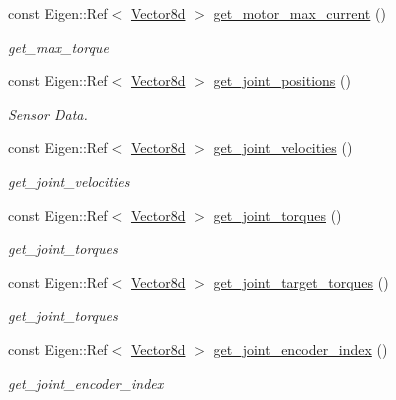 \begin{DoxyCompactItemize}
const Eigen\+::\+Ref$<$ \hyperlink{common__header_8hpp_a98975ffbe0bca1296078e0350dfedd60}{Vector8d} $>$ \hyperlink{classblmc__robots_1_1Solo8TI_a6258a43a859e3cb589e7ed4ad7ca23cc}{get\+\_\+motor\+\_\+max\+\_\+current} ()
\begin{DoxyCompactList}\small\item\em get\+\_\+max\+\_\+torque \end{DoxyCompactList}\item 
const Eigen\+::\+Ref$<$ \hyperlink{common__header_8hpp_a98975ffbe0bca1296078e0350dfedd60}{Vector8d} $>$ \hyperlink{classblmc__robots_1_1Solo8TI_ac9165114408f88accbaa151b797ed1b6}{get\+\_\+joint\+\_\+positions} ()
\begin{DoxyCompactList}\small\item\em Sensor Data. \end{DoxyCompactList}\item 
const Eigen\+::\+Ref$<$ \hyperlink{common__header_8hpp_a98975ffbe0bca1296078e0350dfedd60}{Vector8d} $>$ \hyperlink{classblmc__robots_1_1Solo8TI_ae419d6776511856df3ff54e348774a97}{get\+\_\+joint\+\_\+velocities} ()
\begin{DoxyCompactList}\small\item\em get\+\_\+joint\+\_\+velocities \end{DoxyCompactList}\item 
const Eigen\+::\+Ref$<$ \hyperlink{common__header_8hpp_a98975ffbe0bca1296078e0350dfedd60}{Vector8d} $>$ \hyperlink{classblmc__robots_1_1Solo8TI_a79339925d2ad19cf8efff3af728a766f}{get\+\_\+joint\+\_\+torques} ()
\begin{DoxyCompactList}\small\item\em get\+\_\+joint\+\_\+torques \end{DoxyCompactList}\item 
const Eigen\+::\+Ref$<$ \hyperlink{common__header_8hpp_a98975ffbe0bca1296078e0350dfedd60}{Vector8d} $>$ \hyperlink{classblmc__robots_1_1Solo8TI_a3ed929d26586ef0aa35c4952e8c61f6d}{get\+\_\+joint\+\_\+target\+\_\+torques} ()
\begin{DoxyCompactList}\small\item\em get\+\_\+joint\+\_\+torques \end{DoxyCompactList}\item 
const Eigen\+::\+Ref$<$ \hyperlink{common__header_8hpp_a98975ffbe0bca1296078e0350dfedd60}{Vector8d} $>$ \hyperlink{classblmc__robots_1_1Solo8TI_a64832124d666033300a2d163db799f8a}{get\+\_\+joint\+\_\+encoder\+\_\+index} ()
\begin{DoxyCompactList}\small\item\em get\+\_\+joint\+\_\+encoder\+\_\+index \end{DoxyCompactList}\item 

\end{DoxyCompactItemize}
